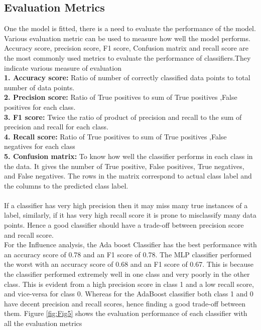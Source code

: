 \documentclass[sigconf]{acmart}
\begin{document}
\subsection{Evaluation Metrics}
One the model is fitted, there is a need to evaluate the performance of the model. Various evaluation metric can be used to measure how well the model performs. Accuracy score, precision score, F1 score, Confusion matrix and recall score are the most commonly used metrics to evaluate the performance of classifiers.They indicate various measure of evaluation\\
\textbf{1. Accuracy score:} Ratio of number of correctly classified data points to total number of data points.\\
\textbf{2. Precision score:}  Ratio of True positives to sum of True positives ,False positives for each class.\\
\textbf{3. F1 score:} Twice the ratio of product of precision and recall to the sum of precision and recall for each class.\\
\textbf{4. Recall score:} Ratio of True positives to sum of True positives ,False negatives for each class\\
\textbf{5. Confusion matrix:} To know how well the classifier performs in each class in the data. It gives the number of True positive, False positives, True negatives, and False negatives. The rows in the matrix correspond to actual class label and the columns to the predicted class label.\\\\
If a classifier has very high precision then it may miss many true instances of a label, similarly, if it has very high recall score it is prone to misclassify many data points. Hence a good classifier should have a trade-off between precision score and recall score.\\
For the Influence analysis, the Ada boost Classifier has the best performance with an accuracy score of 0.78 and an F1 score of 0.78. The MLP classifier performed the worst with an accuracy score of 0.68 and an F1 score of 0.67. This is because the classifier performed extremely well in one class and very poorly in the other class. This is evident from a high precision score in class 1 and a low recall score, and vice-versa for class 0. Whereas for the AdaBoost classifier both class 1 and 0 have decent precision and recall scores, hence finding a good trade-off between them. Figure \ref{fig:Fig5} shows the evaluation performance of each classifier with all the evaluation metrics\\
\end{document}
